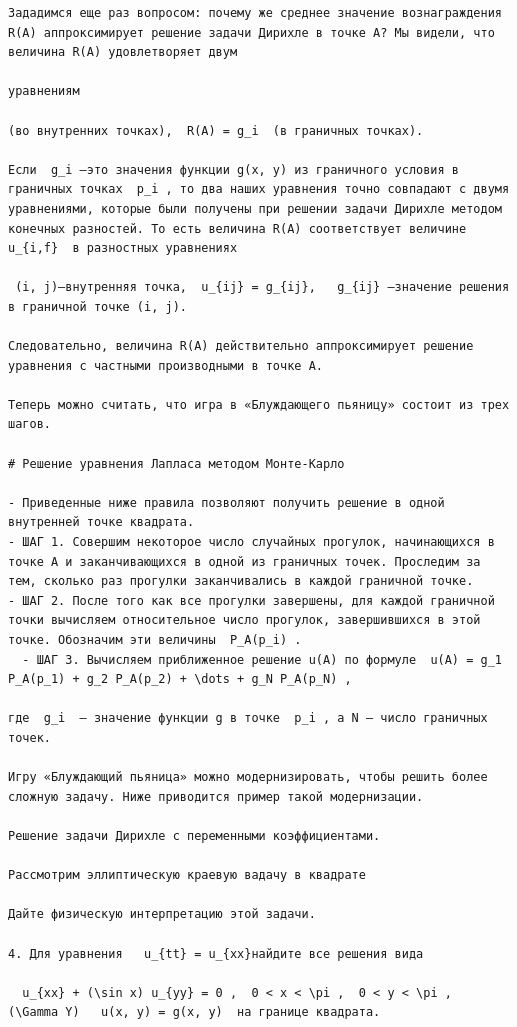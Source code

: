 \documentclass[
  ukrainian,
]{article}
\begin{document}
\begin{verbatim}
Зададимся еще раз вопросом: почему же среднее значение вознаграждения R(A) аппроксимирует решение задачи Дирихле в точке A? Мы видели, что величина R(A) удовлетворяет двум

уравнениям

(во внутренних точках),  R(A) = g_i  (в граничных точках).

Если  g_i —это значения функции g(x, y) из граничного условия в граничных точках  p_i , то два наших уравнения точно совпадают с двумя уравнениями, которые были получены при решении задачи Дирихле методом конечных разностей. То есть величина R(A) соответствует величине  u_{i,f}  в разностных уравнениях

 (i, j)—внутренняя точка,  u_{ij} = g_{ij},   g_{ij} —значение решения в граничной точке (i, j).

Следовательно, величина R(A) действительно аппроксимирует решение уравнения с частными производными в точке A.

Теперь можно считать, что игра в «Блуждающего пьяницу» состоит из трех шагов.

# Решение уравнения Лапласа методом Монте-Карло

- Приведенные ниже правила позволяют получить решение в одной внутренней точке квадрата.
- ШАГ 1. Совершим некоторое число случайных прогулок, начинающихся в точке А и заканчивающихся в одной из граничных точек. Проследим за тем, сколько раз прогулки заканчивались в каждой граничной точке.
- ШАГ 2. После того как все прогулки завершены, для каждой граничной точки вычисляем относительное число прогулок, завершившихся в этой точке. Обозначим эти величины  P_A(p_i) .
  - ШАГ 3. Вычисляем приближенное решение u(A) по формуле  u(A) = g_1 P_A(p_1) + g_2 P_A(p_2) + \dots + g_N P_A(p_N) ,

где  g_i  — значение функции g в точке  p_i , а N — число граничных точек.

Игру «Блуждающий пьяница» можно модернизировать, чтобы решить более сложную задачу. Ниже приводится пример такой модернизации.

Решение задачи Дирихле с переменными коэффициентами.

Рассмотрим эллиптическую краевую вадачу в квадрате

Дайте физическую интерпретацию этой задачи.

4. Для уравнения   u_{tt} = u_{xx}найдите все решения вида

  u_{xx} + (\sin x) u_{yy} = 0 ,  0 < x < \pi ,  0 < y < \pi ,  (\Gamma Y)   u(x, y) = g(x, y)  на границе квадрата.


\end{verbatim}
\end{document}
